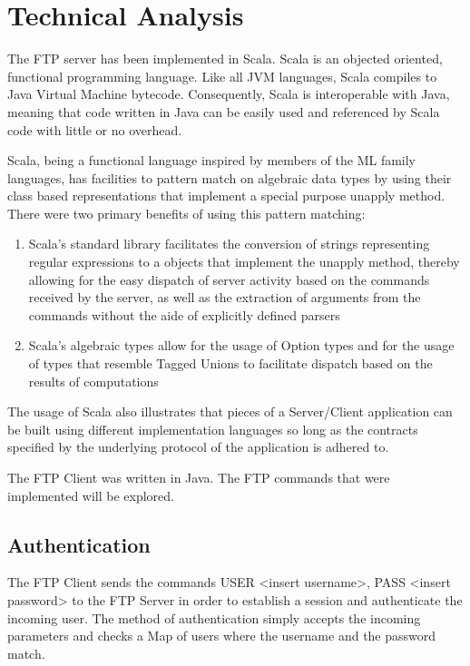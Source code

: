 \chapter{Technical Analysis}
The FTP server has been implemented in Scala. Scala is an objected oriented, functional programming language. Like all JVM languages,
Scala compiles to Java Virtual Machine bytecode. Consequently, Scala is interoperable with Java, meaning that code written in Java can be easily used
and referenced by Scala code with little or no overhead.

Scala, being a functional language inspired by members of the ML family languages, has facilities to pattern match on algebraic data types by using their
class based representations that implement a special purpose unapply method. There were two primary benefits of using this pattern matching:

\begin{enumerate}

	\item Scala's standard library facilitates the conversion of strings representing regular expressions to a objects that implement the unapply method,
	thereby allowing for the easy dispatch of server activity based on the commands received by the server, as well as the extraction of arguments from the commands without
	the aide of explicitly defined parsers

	\item Scala's algebraic types allow for the usage of Option types and for the usage of types that resemble Tagged Unions to facilitate dispatch based on the results of computations

\end{enumerate}


The usage of Scala also illustrates that pieces of a Server/Client application can be built using different implementation languages so long as the contracts
specified by the underlying protocol of the application is adhered to.

The FTP Client was written in Java. The FTP commands that were implemented will be explored.

\section{Authentication}

The FTP Client sends the commands USER <insert username>, PASS <insert password> to the FTP Server
in order to establish a session and authenticate the incoming user. The method of authentication simply
accepts the incoming parameters and checks a Map of users where the username and the password match.

